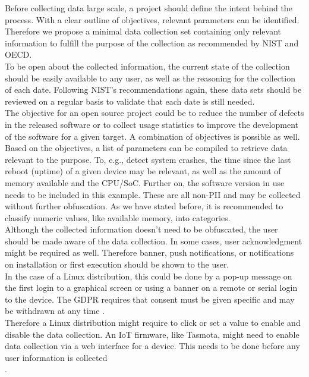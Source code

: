         Before collecting data large scale, a project should define the intent behind the process. With a clear outline of objectives, relevant parameters can be identified. 
        Therefore we propose a minimal data collection set containing only relevant information to fulfill the purpose of the collection as recommended by NIST and OECD.\\
        To be open about the collected information, the current state of the collection should be easily available to any user, as well as the reasoning for the collection of each date.
        Following NIST's recommendations again, these data sets should be reviewed on a regular basis to validate that each date is still needed.\\
        
        The objective for an open source project could be to reduce the number of defects in the released software or to collect usage statistics to improve the development of the software for a given target. A combination of objectives is possible as well.\\
        Based on the objectives, a list of parameters can be compiled to retrieve data relevant to the purpose.
        To, e.g., detect system crashes, the time since the last reboot (uptime) of a given device may be relevant, as well as the amount of memory available and the CPU/SoC. Further on, the software version in use needs to be included in this example. These are all non-PII and may be collected without further obfuscation. As we have stated before, it is recommended to classify numeric values, like available memory, into categories.\\
        
        Although the collected information doesn't need to be obfuscated, the user should be made aware of the data collection. In some cases, user acknowledgment might be required as well. Therefore banner, push notifications, or notifications on installation or first execution should be shown to the user. \\
        In the case of a Linux distribution, this could be done by a pop-up message on the first login to a graphical screen or using a banner on a remote or serial login to the device.
        The GDPR requires that consent must be given specific and may be withdrawn at any time \cite{noauthor_gdpr_2020}.\\ 
        Therefore a Linux distribution might require to click or set a value to enable and disable the data collection. An IoT firmware, like Tasmota, might need to enable data collection via a web interface for a device. This needs to be done before any user information is collected\\. 
        
